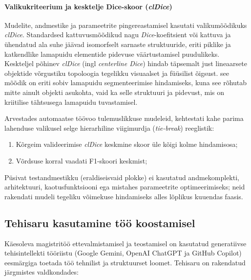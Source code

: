     \paragraph{Valikukriteerium ja kesktelje Dice-skoor (\textit{clDice})}
    Mudelite, andmestike ja parameetrite pingereastamisel kasutati valikumõõdikuks \textit{clDice}. Standardsed kattuvusmõõdikud nagu \textit{Dice}-koefitsient või kattuva ja ühendatud ala suhe jäävad isomorfselt sarnaste struktuuride, eriti piklike ja katkendlike lamapuidu elementide pidevuse väärtustamisel puudulikeks. Keskteljel põhinev \textit{clDice} (ingl \textit{centerline Dice}) hindab täpsemalt just lineaarsete objektide võrgustiku topoloogia tegelikku visuaalset ja füüsilist õigsust. see mõõdik on eriti sobiv lamapuidu segmenteerimise hindamiseks, kuna see rõhutab mitte ainult objekti asukohta, vaid ka selle struktuuri ja pidevust, mis on kriitilise tähtsusega lamapuidu tuvastamisel. 
    
    Arvestades automaatse töövoo tulemuslikkuse mudeleid, kehtestati kahe parima lahenduse valikusel selge hierarhiline viigimurdja (\textit{tie-break}) reeglistik:
    \begin{enumerate}
        \item Kõrgeim valideerimise \textit{clDice} keskmine skoor üle kõigi kolme hindamisosa;
        \item Võrdsuse korral vaadati F1-skoori keskmist;
    \end{enumerate}
    Püsivat testandmestikku (eraldiseisvaid plokke) ei kasutatud andmekomplekti, arhitektuuri, kaotusfunktsiooni ega mistahes parameetrite optimeerimiseks; neid rakendati mudeli tegeliku võimekuse hindamiseks alles lõplikus kuuendas faasis.


\subsection{Tehisaru kasutamine töö koostamisel}
\label{subsec:tehisaru-kasutus}

Käesoleva magistritöö ettevalmistamisel ja teostamisel on kasutatud generatiivse tehisintellekti tööriistu (Google Gemini, OpenAI ChatGPT ja GitHub Copilot) eesmärgiga toetada töö tehnilist ja struktuurset loomet. Tehisaru on rakendatud järgmistes valdkondades:

